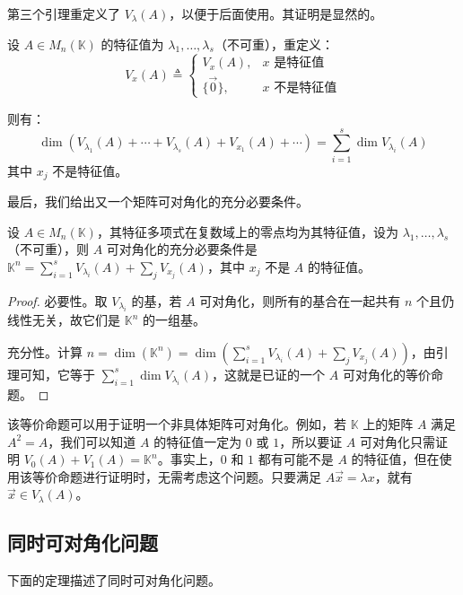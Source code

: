 第三个引理重定义了 $V_\lambda(A)$，以便于后面使用。其证明是显然的。

\begin{theorem}
	设 $A \in M_n(\mathbb K)$ 的特征值为 $\lambda_1, \ldots, \lambda_s$（不可重），重定义：
	$$
	V_x(A) \triangleq
	\begin{cases}
		V_x(A), & \text{$x$ 是特征值} \\ \{ \vec 0 \}, & \text{$x$ 不是特征值}
	\end{cases}
	$$

	则有：
	$$
	\dim(V_{\lambda_1}(A) + \cdots + V_{\lambda_s}(A) + V_{x_1}(A) + \cdots) = \sum\limits_{i = 1}^s \dim V_{\lambda_i}(A)
	$$
	其中 $x_j$ 不是特征值。
\end{theorem}

最后，我们给出又一个矩阵可对角化的充分必要条件。

\begin{theorem}
	设 $A \in M_n(\mathbb K)$，其特征多项式在复数域上的零点均为其特征值，设为 $\lambda_1, \ldots, \lambda_s$（不可重），则 $A$ 可对角化的充分必要条件是 $\mathbb K^n = \sum\limits_{i = 1}^s V_{\lambda_i}(A) + \sum\limits_{j} V_{x_j}(A)$，其中 $x_j$ 不是 $A$ 的特征值。
\end{theorem}

\begin{proof}
	必要性。取 $V_{\lambda_i}$ 的基，若 $A$ 可对角化，则所有的基合在一起共有 $n$ 个且仍线性无关，故它们是 $\mathbb K^n$ 的一组基。

	充分性。计算 $n = \dim(\mathbb K^n) = \dim \left( \sum\limits_{i = 1}^s V_{\lambda_i}(A) + \sum\limits_j V_{x_j}(A) \right)$，由引理可知，它等于 $\sum\limits_{i = 1}^s \dim V_{\lambda_i}(A)$，这就是已证的一个 $A$ 可对角化的等价命题。
\end{proof}


该等价命题可以用于证明一个非具体矩阵可对角化。例如，若 $\mathbb K$ 上的矩阵 $A$ 满足 $A^2 = A$，我们可以知道 $A$ 的特征值一定为 $0$ 或 $1$，所以要证 $A$ 可对角化只需证明 $V_0(A) + V_1(A) = \mathbb K^n$。事实上，$0$ 和 $1$ 都有可能不是 $A$ 的特征值，但在使用该等价命题进行证明时，无需考虑这个问题。只要满足 $A \vec x = \lambda x$，就有 $\vec x \in V_\lambda(A)$。

\subsection{同时可对角化问题}

下面的定理描述了同时可对角化问题。

